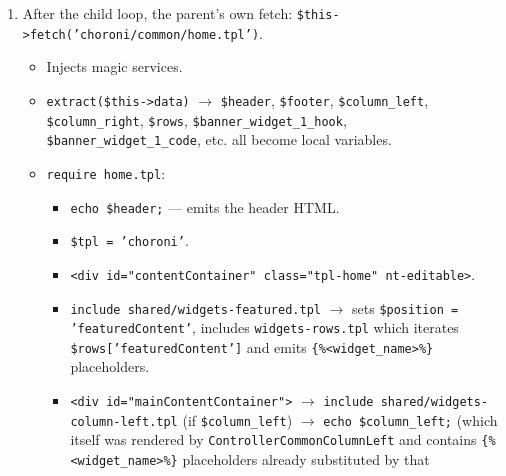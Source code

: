 \documentclass[11pt,a4paper]{article}
\begin{document}
\begin{enumerate}[leftmargin=1.6em,itemsep=2pt]
\begin{itemize}[itemsep=2pt]
          \item Back in the parent:
                \texttt{\$this->data[\$key . '\_hook'] = \$key}
                (e.g.\ \texttt{'banner\_widget\_1\_hook' = 'banner\_widget\_1'});
                \texttt{\$this->data[\$key . '\_code'] = \$output}
                (the rendered slider HTML).
        \end{itemize}
  \item After the child loop, the parent's own fetch:
        \texttt{\$this->fetch('choroni/common/home.tpl')}.
        \begin{itemize}[itemsep=2pt]
          \item Injects magic services.
          \item \texttt{extract(\$this->data)} $\to$
                \texttt{\$header}, \texttt{\$footer},
                \texttt{\$column\_left}, \texttt{\$column\_right},
                \texttt{\$rows}, \texttt{\$banner\_widget\_1\_hook},
                \texttt{\$banner\_widget\_1\_code}, etc. all become
                local variables.
          \item \texttt{require home.tpl}:
                \begin{itemize}[itemsep=2pt]
                  \item \texttt{echo \$header;} --- emits the
                        header HTML.
                  \item \texttt{\$tpl = 'choroni'}.
                  \item \texttt{<div id="contentContainer"
                        class="tpl-home" nt-editable>}.
                  \item \texttt{include shared/widgets-featured.tpl}
                        $\to$ sets \texttt{\$position =
                        'featuredContent'}, includes
                        \texttt{widgets-rows.tpl} which iterates
                        \texttt{\$rows['featuredContent']} and
                        emits \texttt{\{\%<widget\_name>\%\}}
                        placeholders.
                  \item \texttt{<div id="mainContentContainer">}
                        $\to$ \texttt{include shared/widgets-column-left.tpl}
                        (if \texttt{\$column\_left}) $\to$
                        \texttt{echo \$column\_left;} (which itself
                        was rendered by
                        \texttt{ControllerCommonColumnLeft} and
                        contains \texttt{\{\%<widget\_name>\%\}}
                        placeholders already substituted by that

\end{itemize}
\end{itemize}
\end{enumerate}
\end{document}
